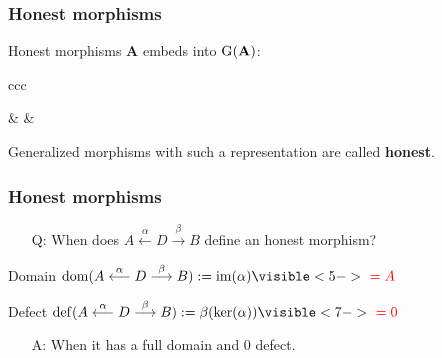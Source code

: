 \begin{frame}[fragile]
 \frametitle{Honest morphisms}
 \pause
 \begin{block}{Honest morphisms}
  $\mathbf{A}$ embeds into $\operatorname{G}( \mathbf{A} )$:
  \pause
  \begin{center}
   \begin{tabular}{ccc}
    \begin{tikzpicture}[baseline=(base)]
        \coordinate (r) at (2.5,0);
        \coordinate (d) at (0,-2);
        \node (A) {$A$};
        \node (B) at ($(A) + (r)$) {$B$};
        \node (base) at ($(A) + (0,-0.1)$) {};
        \draw[->,thick,blue] (A) -- (B);
    \end{tikzpicture}
    
    &
    \pause {$\mapsto$} \pause
    &
  \end{tabular}
  \end{center}
  \pause
  Generalized morphisms with such a representation are called \textbf{honest}.
 \end{block}
\end{frame}

% 
\begin{frame}[fragile]
 \frametitle{Honest morphisms}
 \begin{itemize}
  \item[Q:] When does $A \stackrel{\alpha}{\longleftarrow} D \stackrel{\beta}{\longrightarrow} B$ define an honest morphism?
 \end{itemize}
 \pause
 \begin{block}{Domain}
  $\domain(A \stackrel{\alpha}{\longleftarrow} D \stackrel{\beta}{\longrightarrow} B) := \im( \alpha ) \visible<5->{{\color{red}\ = A }}$
 \end{block}
 \pause
 \begin{block}{Defect}
  $\defect(A \stackrel{\alpha}{\longleftarrow} D \stackrel{\beta}{\longrightarrow} B) := \beta( \kernel( \alpha ) ) \visible<7->{{\color{red}\ = 0 }}$
 \end{block}
 \pause
 \begin{itemize}
  \item[A:] When it has a full domain \pause\pause and $0$ defect.
 \end{itemize}

\end{frame}

